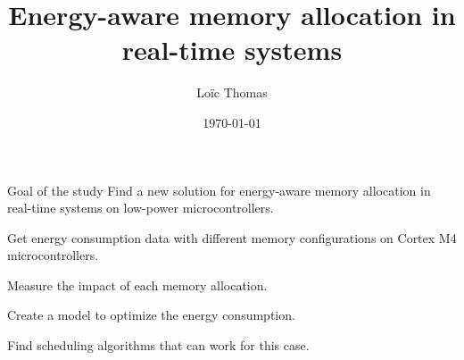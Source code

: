 \documentclass[
	11pt, %
]{beamer}
\title[]{Energy-aware memory allocation in real-time systems} %
\subtitle{} %
\author[]{Loïc Thomas} %
\institute[]{LAAS CNRS - VERTICS \\ \smallskip  \textit{l\_thomas@insa-toulouse.fr}} %
\date[\today]{\today} %
\begin{document}

\begin{frame}
	\titlepage %
\end{frame}




\begin{frame}{Goal of the study}
	Find a new solution for energy-aware memory allocation in real-time systems on low-power microcontrollers.
	\begin{enumerate}
		{\item Get energy consumption data with different memory configurations on Cortex M4 microcontrollers.}
		{\item Measure the impact of each memory allocation.}
		{\item Create a model to optimize the energy consumption.}
		{\item Find scheduling algorithms that can work for this case.}
	\end{enumerate}
\end{frame}
\end{document}
